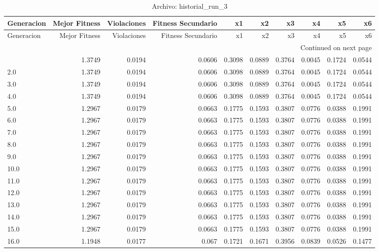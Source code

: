 \begin{longtable}{lrrrrrrrrr}
\caption{Archivo: historial\_run\_3}\label{tab:historial_run_3} \\
\toprule
Generacion & Mejor Fitness & Violaciones & Fitness Secundario & x1 & x2 & x3 & x4 & x5 & x6 \\
\midrule
\endfirsthead
\toprule
Generacion & Mejor Fitness & Violaciones & Fitness Secundario & x1 & x2 & x3 & x4 & x5 & x6 \\
\midrule
\endhead
\midrule
\multicolumn{10}{r}{Continued on next page} \\
\midrule
\endfoot
\bottomrule
\endlastfoot
1.0 & 1.3749 & 0.0194 & 0.0606 & 0.3098 & 0.0889 & 0.3764 & 0.0045 & 0.1724 & 0.0544 \\
2.0 & 1.3749 & 0.0194 & 0.0606 & 0.3098 & 0.0889 & 0.3764 & 0.0045 & 0.1724 & 0.0544 \\
3.0 & 1.3749 & 0.0194 & 0.0606 & 0.3098 & 0.0889 & 0.3764 & 0.0045 & 0.1724 & 0.0544 \\
4.0 & 1.3749 & 0.0194 & 0.0606 & 0.3098 & 0.0889 & 0.3764 & 0.0045 & 0.1724 & 0.0544 \\
5.0 & 1.2967 & 0.0179 & 0.0663 & 0.1775 & 0.1593 & 0.3807 & 0.0776 & 0.0388 & 0.1991 \\
6.0 & 1.2967 & 0.0179 & 0.0663 & 0.1775 & 0.1593 & 0.3807 & 0.0776 & 0.0388 & 0.1991 \\
7.0 & 1.2967 & 0.0179 & 0.0663 & 0.1775 & 0.1593 & 0.3807 & 0.0776 & 0.0388 & 0.1991 \\
8.0 & 1.2967 & 0.0179 & 0.0663 & 0.1775 & 0.1593 & 0.3807 & 0.0776 & 0.0388 & 0.1991 \\
9.0 & 1.2967 & 0.0179 & 0.0663 & 0.1775 & 0.1593 & 0.3807 & 0.0776 & 0.0388 & 0.1991 \\
10.0 & 1.2967 & 0.0179 & 0.0663 & 0.1775 & 0.1593 & 0.3807 & 0.0776 & 0.0388 & 0.1991 \\
11.0 & 1.2967 & 0.0179 & 0.0663 & 0.1775 & 0.1593 & 0.3807 & 0.0776 & 0.0388 & 0.1991 \\
12.0 & 1.2967 & 0.0179 & 0.0663 & 0.1775 & 0.1593 & 0.3807 & 0.0776 & 0.0388 & 0.1991 \\
13.0 & 1.2967 & 0.0179 & 0.0663 & 0.1775 & 0.1593 & 0.3807 & 0.0776 & 0.0388 & 0.1991 \\
14.0 & 1.2967 & 0.0179 & 0.0663 & 0.1775 & 0.1593 & 0.3807 & 0.0776 & 0.0388 & 0.1991 \\
15.0 & 1.2967 & 0.0179 & 0.0663 & 0.1775 & 0.1593 & 0.3807 & 0.0776 & 0.0388 & 0.1991 \\
16.0 & 1.1948 & 0.0177 & 0.067 & 0.1721 & 0.1671 & 0.3956 & 0.0839 & 0.0526 & 0.1477 \\

\end{longtable}
